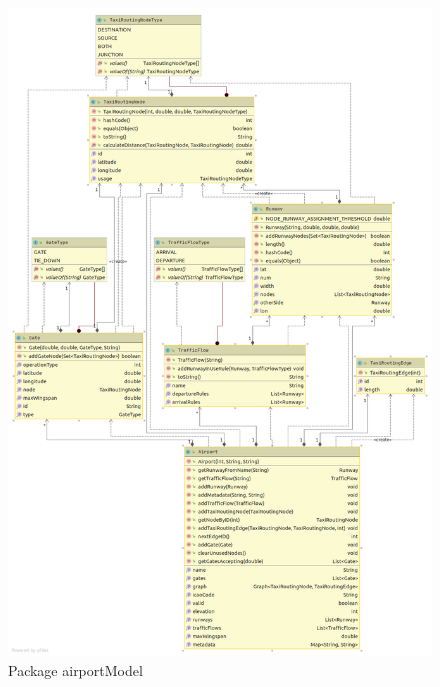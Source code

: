 \documentclass[a4paper, 12pt]{article}
\begin{document}
\begin{figure}[H]
\caption{Package airportModel}
 \label{fig:airpModel}
\hfill \includegraphics[height=\textheight]{resources/images/UML/Package airportModel.png} \hspace*{\fill}
\end{figure}
\end{document}
